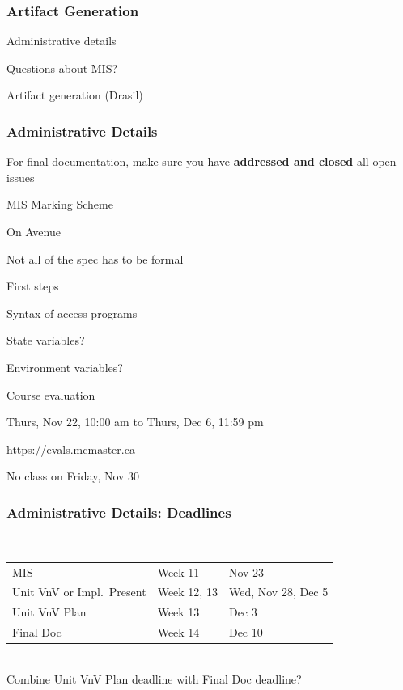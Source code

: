 \documentclass[t,12pt,numbers,fleqn]{beamer}
\begin{document}



\begin{frame}
\frametitle{Artifact Generation}

\bi
\item Administrative details
\item Questions about MIS?
\item Artifact generation (Drasil)
\ei
\end{frame}


\begin{frame}
\frametitle{Administrative Details}

\bi
\item For final documentation, make sure you have \textbf{addressed and closed}
  all open issues
\item MIS Marking Scheme
\bi
\item On Avenue
\item Not all of the spec has to be formal
\item First steps
\bi
\item Syntax of access programs
\item State variables?
\item Environment variables?
\ei
\ei
\item Course evaluation
\bi
\item Thurs, Nov 22, 10:00 am to Thurs, Dec 6, 11:59 pm
\item \url{https://evals.mcmaster.ca}
\ei
\item No class on Friday, Nov 30
\ei

\end{frame}


\begin{frame}
\frametitle{Administrative Details: Deadlines}
~\newline
\begin{tabular}{l l l}
MIS & Week 11 & Nov 23\\
Unit VnV or Impl.\ Present & Week 12, 13 & Wed, Nov 28, Dec 5\\
Unit VnV Plan & Week 13 & Dec 3\\
Final Doc & Week 14 & Dec 10\\
\end {tabular}
~\\

Combine Unit VnV Plan deadline with Final Doc deadline?

\end{frame}
\end{document}
